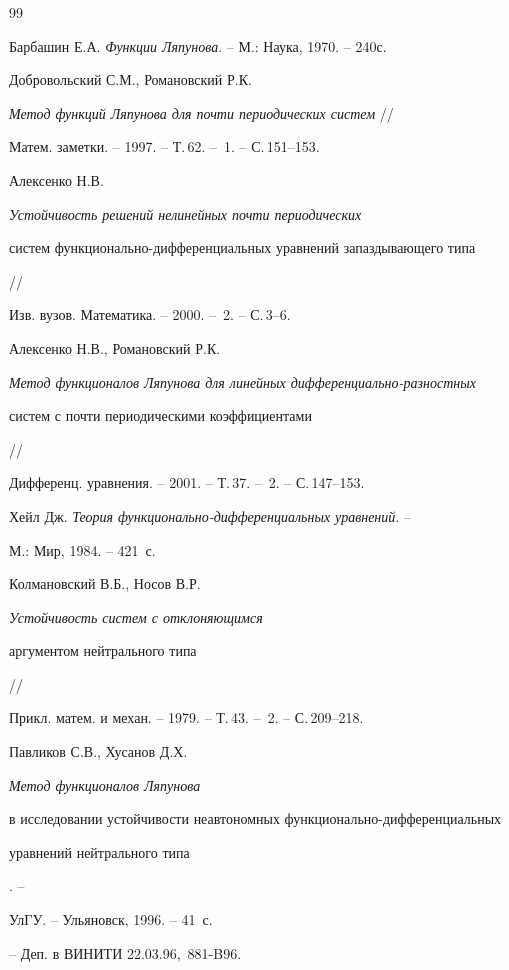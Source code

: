 \begin{thebibliography}{99}







Барбашин Е.А. {\em Функции Ляпунова}. -- М.: Наука, 1970. -- 240с.




Добровольский С.М., Романовский Р.К.


{\em Метод функций Ляпунова для почти периодических систем} //


Матем. заметки. -- 1997. -- Т.\,62. -- \No\,1. -- С.\,151--153.




Алексенко Н.В. {\em Устойчивость решений нелинейных почти периодических


систем функционально-дифференциальных уравнений запаздывающего типа} //


Изв. вузов. Математика. -- 2000. -- \No\,2. -- С.\,3--6.




Алексенко Н.В., Романовский Р.К.


{\em Метод функционалов Ляпунова для линейных дифференциально-разностных 


систем с почти периодическими коэффициентами} //


Дифференц. уравнения. -- 2001. -- Т.\,37. -- \No\,2. -- С.\,147--153.




Хейл Дж. {\em Теория функционально-дифференциальных уравнений}. -- 


М.: Мир, 1984. -- 421~с.




Колмановский В.Б., Носов В.Р. {\em Устойчивость систем с отклоняющимся


аргументом нейтрального типа} //


Прикл. матем. и механ. -- 1979. -- Т.\,43. -- \No\,2. -- С.\,209--218.




Павликов С.В., Хусанов Д.Х. {\em Метод функционалов Ляпунова


в исследовании устойчивости неавтономных функционально-дифференциальных


уравнений нейтрального типа}. --


УлГУ. --  Ульяновск, 1996. -- 41~с.


-- Деп. в ВИНИТИ 22.03.96, \No\,881-B96.



\end{thebibliography}
